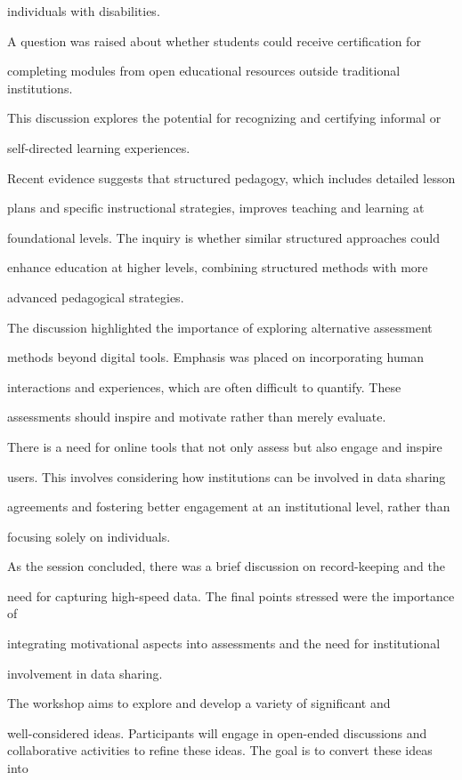 \documentclass[11pt]{article}
\begin{document}
individuals with disabilities.

A question was raised about whether students could receive certification for

completing modules from open educational resources outside traditional institutions.

This discussion explores the potential for recognizing and certifying informal or

self-directed learning experiences.

Recent evidence suggests that structured pedagogy, which includes detailed lesson

plans and specific instructional strategies, improves teaching and learning at

foundational levels. The inquiry is whether similar structured approaches could

enhance education at higher levels, combining structured methods with more

advanced pedagogical strategies.

The discussion highlighted the importance of exploring alternative assessment

methods beyond digital tools. Emphasis was placed on incorporating human

interactions and experiences, which are often difficult to quantify. These

assessments should inspire and motivate rather than merely evaluate.

There is a need for online tools that not only assess but also engage and inspire

users. This involves considering how institutions can be involved in data sharing

agreements and fostering better engagement at an institutional level, rather than

focusing solely on individuals.

As the session concluded, there was a brief discussion on record-keeping and the

need for capturing high-speed data. The final points stressed were the importance of

integrating motivational aspects into assessments and the need for institutional

involvement in data sharing.

The workshop aims to explore and develop a variety of significant and

well-considered ideas. Participants will engage in open-ended discussions and collaborative activities to refine these ideas. The goal is to convert these ideas into
\end{document}
